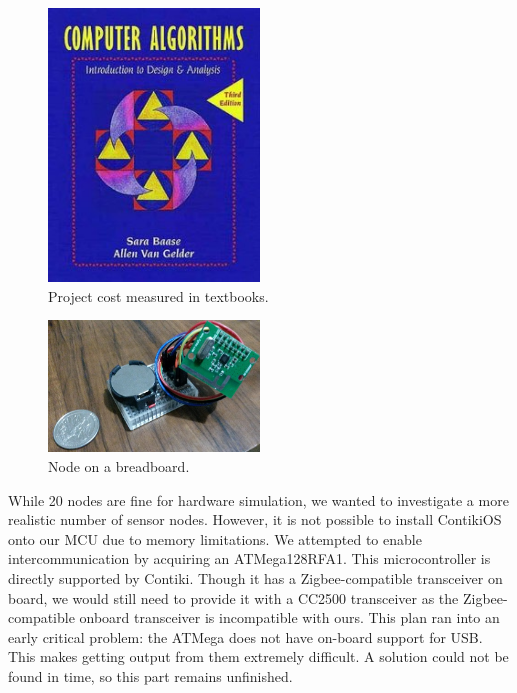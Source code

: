 \begin{figure}[h!]
  \centering
  \includegraphics[width=0.5\textwidth]{images/textbook.png}
  \caption{Project cost measured in textbooks.
  \label{img:flowchart}
  }
\end{figure}

\begin{figure}[h!]
  \centering
  \includegraphics[width=0.5\textwidth]{images/phone_picture.png}
  \caption{Node on a breadboard.
  \label{img:flowchart}
  }
\end{figure}

While 20 nodes are fine for hardware simulation, we wanted to investigate a more realistic number of sensor nodes. However, it is not possible to install ContikiOS onto our MCU due to memory limitations. We attempted to enable intercommunication by acquiring an ATMega128RFA1. This microcontroller is directly supported by Contiki. Though it has a Zigbee-compatible transceiver on board, we would still need to provide it with a CC2500 transceiver as the Zigbee-compatible onboard transceiver is incompatible with ours. This plan ran into an early critical problem: the ATMega does not have on-board support for USB. This makes getting output from them extremely difficult. A solution could not be found in time, so this part remains unfinished.
